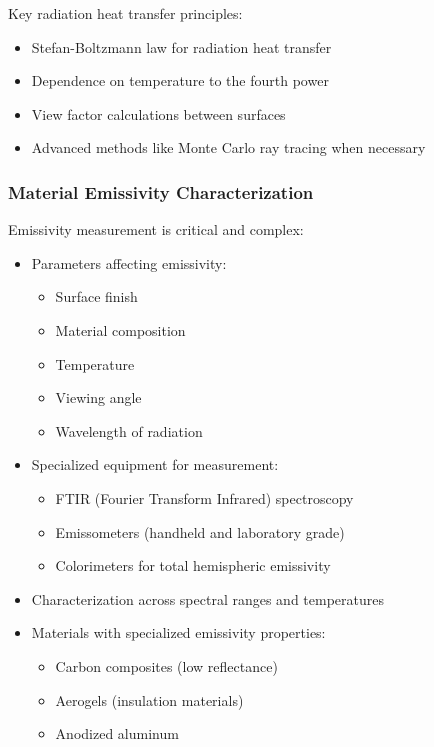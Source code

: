 Key radiation heat transfer principles:
\begin{itemize}
    \item Stefan-Boltzmann law for radiation heat transfer
    \item Dependence on temperature to the fourth power
    \item View factor calculations between surfaces
    \item Advanced methods like Monte Carlo ray tracing when necessary
\end{itemize}

\subsubsection*{Material Emissivity Characterization}

Emissivity measurement is critical and complex:
\begin{itemize}
    \item Parameters affecting emissivity:
    \begin{itemize}
        \item Surface finish
        \item Material composition
        \item Temperature
        \item Viewing angle
        \item Wavelength of radiation
    \end{itemize}
    \item Specialized equipment for measurement:
    \begin{itemize}
        \item FTIR (Fourier Transform Infrared) spectroscopy
        \item Emissometers (handheld and laboratory grade)
        \item Colorimeters for total hemispheric emissivity
    \end{itemize}
    \item Characterization across spectral ranges and temperatures
    \item Materials with specialized emissivity properties:
    \begin{itemize}
        \item Carbon composites (low reflectance)
        \item Aerogels (insulation materials)
        \item Anodized aluminum
    \end{itemize}
\end{itemize}

